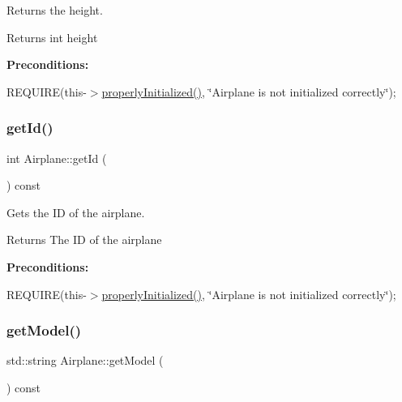 Returns the height. 

\begin{DoxyReturn}{Returns}
int height
\end{DoxyReturn}
{\bfseries Preconditions\+:}
\begin{DoxyItemize}
\item R\+E\+Q\+U\+I\+RE(this-\/$>$\mbox{\hyperlink{class_airplane_a6f80df8f692cc8d67d292c1e9f26d59e}{properly\+Initialized()}}, \char`\"{}\+Airplane is not initialized correctly\char`\"{}); 
\end{DoxyItemize}\mbox{\label{class_airplane_aedac81e80b724d61d1c9df7311067ba8}} 
\subsubsection{\texorpdfstring{get\+Id()}{getId()}}
{\footnotesize\ttfamily int Airplane\+::get\+Id (\begin{DoxyParamCaption}{ }\end{DoxyParamCaption}) const}



Gets the ID of the airplane. 

\begin{DoxyReturn}{Returns}
The ID of the airplane
\end{DoxyReturn}
{\bfseries Preconditions\+:}
\begin{DoxyItemize}
\item R\+E\+Q\+U\+I\+RE(this-\/$>$\mbox{\hyperlink{class_airplane_a6f80df8f692cc8d67d292c1e9f26d59e}{properly\+Initialized()}}, \char`\"{}\+Airplane is not initialized correctly\char`\"{}); 
\end{DoxyItemize}\mbox{\label{class_airplane_a1431ee85bdcb3238cf6f0aefc51d8828}} 
\subsubsection{\texorpdfstring{get\+Model()}{getModel()}}
{\footnotesize\ttfamily std\+::string Airplane\+::get\+Model (\begin{DoxyParamCaption}{ }\end{DoxyParamCaption}) const}



